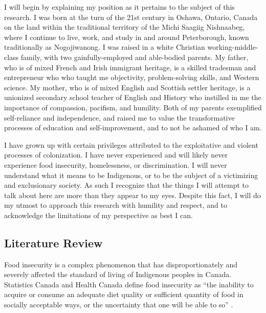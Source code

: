 \documentclass{report}
\begin{document}
\hspace{24pt} I will begin by explaining my position as it pertains to the subject of this research. I was born at the turn of the 21st century in Oshawa, Ontario, Canada on the land within the traditional territory of the Michi Saagiig Nishnaabeg, where I continue to live, work, and study in and around Peterborough, known traditionally as Nogojiwanong. I was raised in a white Christian working-middle-class family, with two gainfully-employed and able-bodied parents. My father, who is of mixed French and Irish immigrant heritage, is a skilled tradesman and entrepreneur who who taught me objectivity, problem-solving skills, and Western science. My mother, who is of mixed English and Scottish settler heritage, is a unionized secondary school teacher of English and History who instilled in me the importance of compassion, pacifism, and humility. Both of my parents exemplified self-reliance and independence, and raised me to value the transformative processes of education and self-improvement, and to not be ashamed of who I am.

\hspace{24pt} I have grown up with certain privileges attributed to the exploitative and violent processes of colonization. I have never experienced and will likely never experience food insecurity, homelessness, or discrimination. I will never understand what it means to be Indigenous, or to be the subject of a victimizing and exclusionary society. As such I recognize that the things I will attempt to talk about here are more than they appear to my eyes. Despite this fact, I will do my utmost to approach this research with humility and respect, and to acknowledge the limitations of my perspective as best I can.

\clearpage

\subsection{Literature Review}



\hspace{24pt} Food insecurity is a complex phenomenon that has disproportionately and severely affected the standard of living of Indigenous peoples in Canada.
Statistics Canada and Health Canada define food insecurity as ``the inability to acquire or consume an adequate diet quality or sufficient quantity of food in socially acceptable ways, or the uncertainty that one will be able to so'' \parencite{statscanfoodinsecurity}.
\end{document}
